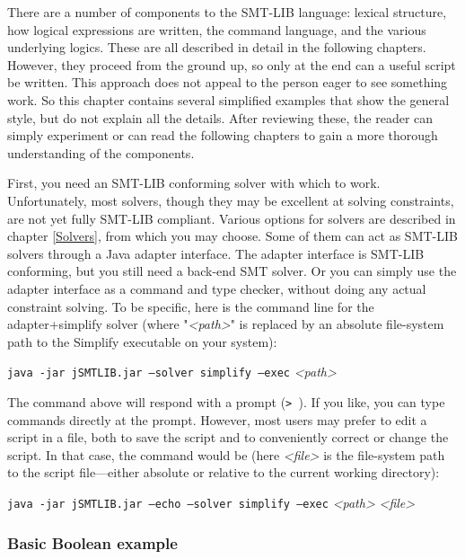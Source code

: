 \documentclass[12pt,oneside]{report}
\begin{document}
There are a number of components to the SMT-LIB language: lexical structure, how logical expressions are written, the command language, and the various underlying logics.  These are all described in detail in the following chapters. However, they proceed from the ground up, so only at the end can a useful script be written. This approach does not appeal to the person eager to see something work. So this chapter contains several simplified examples that show the general style, but do not explain all the details.  After reviewing these, the reader can simply experiment or can read the following chapters to gain a more thorough 
understanding of the components.

First, you need an SMT-LIB conforming solver with which to work.  Unfortunately, most solvers, though they may be excellent at solving constraints, are not yet fully SMT-LIB compliant.  Various options for solvers are described in chapter \ref{Solvers}, from which you may choose.
Some of them can act as SMT-LIB solvers through a Java adapter interface.  The adapter interface is SMT-LIB conforming, but you still need a back-end SMT solver.  Or you can simply use the adapter interface as a command and type checker, without doing any actual constraint solving.
To be specific, here is the command line for the adapter+simplify solver (where "{\it <path>}" is replaced by an absolute file-system path to the Simplify executable on your system):\\
\centerline{{\tt java -jar jSMTLIB.jar --solver simplify --exec} {\it <path>}}

The command above will respond with a prompt (\verb|> |). If you like, you can type commands directly at the prompt. However, most users may
prefer to edit a script in a file, both to save the script and to conveniently correct or change the script. In that case, the command would be (here {\it <file>} is the file-system path to the script file---either absolute or relative to the current working directory):\\
\centerline{{\tt java -jar jSMTLIB.jar --echo --solver simplify --exec} {\it <path>} {\it <file>}}

\subsubsection*{Basic Boolean example}
\end{document}
